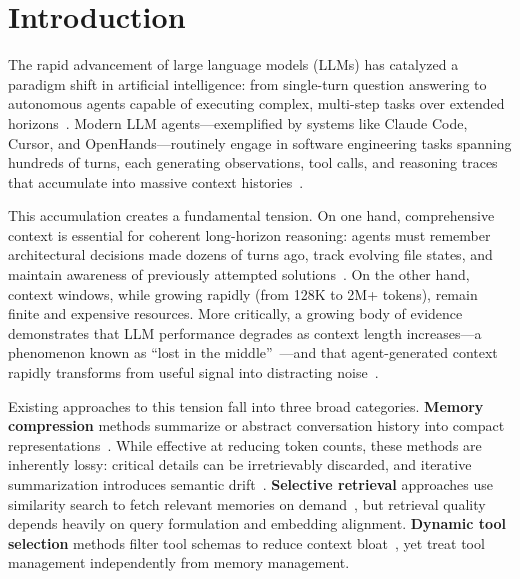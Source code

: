 \section{Introduction}

The rapid advancement of large language models (LLMs) has catalyzed a paradigm shift in artificial intelligence: from single-turn question answering to autonomous agents capable of executing complex, multi-step tasks over extended horizons~\citep{yao2023react, park2023generative, wang2024survey}. Modern LLM agents---exemplified by systems like Claude Code, Cursor, and OpenHands---routinely engage in software engineering tasks spanning hundreds of turns, each generating observations, tool calls, and reasoning traces that accumulate into massive context histories~\citep{jimenez2024swe, zhou2023webarena, liu2023agentbench}.

This accumulation creates a fundamental tension. On one hand, comprehensive context is essential for coherent long-horizon reasoning: agents must remember architectural decisions made dozens of turns ago, track evolving file states, and maintain awareness of previously attempted solutions~\citep{liu2024lost}. On the other hand, context windows, while growing rapidly (from 128K to 2M+ tokens), remain finite and expensive resources. More critically, a growing body of evidence demonstrates that LLM performance degrades as context length increases---a phenomenon known as ``lost in the middle''~\citep{liu2024lost}---and that agent-generated context rapidly transforms from useful signal into distracting noise~\citep{jetbrains2025context}.

Existing approaches to this tension fall into three broad categories. \textbf{Memory compression} methods summarize or abstract conversation history into compact representations~\citep{packer2023memgpt, zhong2024memorybank, xu2025amem}. While effective at reducing token counts, these methods are inherently lossy: critical details can be irretrievably discarded, and iterative summarization introduces semantic drift~\citep{chen2025promem}. \textbf{Selective retrieval} approaches use similarity search to fetch relevant memories on demand~\citep{lewis2020rag, asai2023selfrag}, but retrieval quality depends heavily on query formulation and embedding alignment. \textbf{Dynamic tool selection} methods filter tool schemas to reduce context bloat~\citep{zhang2025autotool, anthropic2025context}, yet treat tool management independently from memory management.

